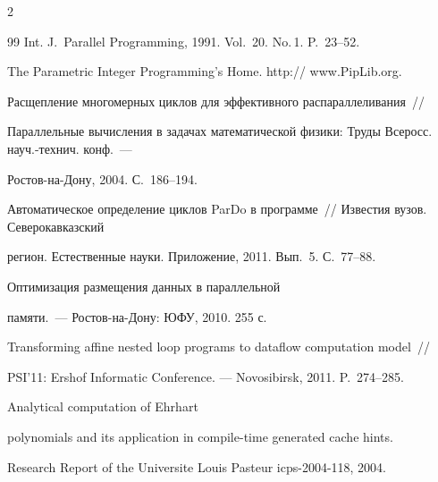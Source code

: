 \begin{multicols}{2}
{{\begin{thebibliography}{99}
Int. J.~Parallel  Programming, 1991. Vol.~20. No.\,1. P.~23--52.






The Parametric Integer Programming's Home. {\sf http:// www.PipLib.org}.









Расщепление многомерных циклов для эффективного распараллеливания~// 

Параллельные вычисления в задачах математической физики: Труды Всеросс. науч.-технич. конф.~--- 

Ростов-на-Дону, 2004. С.~186--194.





Автоматическое определение цик\-лов ParDo в программе~// Известия вузов. Северокавказский

    регион. Естественные науки. Приложение, 2011. Вып.~5. С.~77--88.



  Оптимизация размещения данных в параллельной 

памяти.~--- Ростов-на-Дону: ЮФУ, 2010. 255 с.



  

Transforming affine nested loop programs to dataflow computation model~// 

PSI'11: Ershof Informatic Conference. --- Novosibirsk, 2011. P.~274--285.





Analytical computation of Ehrhart

    polynomials and its application in compile-time generated cache hints. 

    Research Report of the Universite Louis Pasteur icps-2004-118, 2004.



  


\end{thebibliography}}}
\end{multicols}
